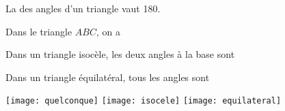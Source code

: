 \begin{myprop}
	La \hspace*{5cm} des angles d'un triangle vaut 180\degree.
\end{myprop}


\begin{myexs}
	\begin{multicols}{2}
		\vspace*{1cm}
			Dans le triangle $ABC$, on a \\ %
		\vspace*{1cm}
		
		
			Dans un triangle isocèle, les deux angles à la base sont %
			\vspace*{2.5cm}
		
		
			Dans un triangle équilatéral, tous les angles sont %
			
		\begin{center}	
		\texttt{[image: quelconque]}	
		\texttt{[image: isocele]}	
		\texttt{[image: equilateral]}
		\end{center}
	\end{multicols}
\end{myexs}